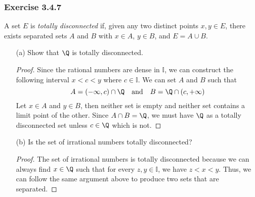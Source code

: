 \subsubsection{Exercise 3.4.7} A set \( E \) is \textit{totally disconnected} if, given any two distinct points \( x, y \in E  \), there exists separated sets \( A  \) and \( B  \) with \( x \in A  \), \( y \in B  \), and \( E = A \cup B  \).

\begin{enumerate}
    \item[(a)] Show that \( \Q  \) is totally disconnected.
        \begin{proof}
            Since the rational numbers are dense in \( \mathbb{I} \), we can construct the following interval \( x < c < y  \) where \( c \in \mathbb{I}  \). We can set \( A  \) and \( B \) such that 
            \[  A = (-\infty, c ) \cap \Q \text{ ~ and ~ } B = \Q \cap (c, +\infty )   \]
            Let \( x \in A  \) and \( y \in B  \), then neither set is empty and neither set contains a limit  point of the other. Since \( A \cap B = \Q  \), we must have \( \Q  \) as a totally disconnected set unless \( c \in \Q  \) which is not. 
        \end{proof}
    \item[(b)] Is the set of irrational numbers totally disconnected? 
        \begin{proof}
            The set of irrational numbers is totally disconnected because we can always find \( x \in \Q  \) such that for every \( z,y \in \mathbb{I} \), we have \( z < x < y  \). Thus, we can follow the same argument above to produce two sets that are separated.
        \end{proof}
\end{enumerate}


